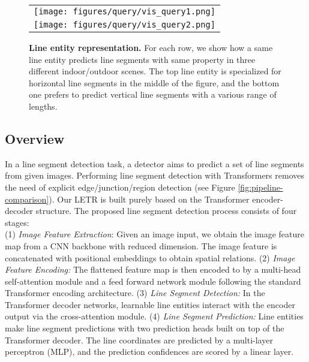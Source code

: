 \documentclass[final]{cvpr}
\begin{document}
\begin{figure}
\begin{center}
\begin{tabular}{c}
\texttt{[image: figures/query/vis\_query1.png]} \\
\texttt{[image: figures/query/vis\_query2.png]}

\end{tabular}
\caption{\small \textbf{Line entity representation.} For each row, we show how a same line entity predicts line segments with same property in three different indoor/outdoor scenes. The top line entity is specialized for horizontal line segments in the middle of the figure, and the bottom one prefers to predict vertical line segments with a various range of lengths.}
\label{fig:vis_q1}
\vspace{-10mm}
\end{center}
\end{figure}
\vspace{-2mm}
\subsection{Overview}
\vspace{-2mm}
In a line segment detection task, a detector aims to predict a set of line segments from given images. Performing line segment detection with Transformers removes the need of explicit edge/junction/region detection \cite{zhou2019end, xue2020holistically} (see Figure \ref{fig:pipeline-comparison}). Our LETR is built purely based on the Transformer encoder-decoder structure. The proposed line segment detection process consists of four stages: \\
(1) {\em Image Feature Extraction}: Given an image input, we obtain the image feature map  from a CNN backbone with reduced dimension. The image feature is concatenated with positional embeddings to obtain spatial relations. (2) {\em Image Feature Encoding:} The flattened feature map  is then encoded to  by a multi-head self-attention module and a feed forward network module following the standard Transformer encoding architecture. (3) {\em Line Segment Detection:} In the Transformer decoder networks,  learnable line entities  interact with the encoder output via the cross-attention module. (4) {\em Line Segment Prediction:} Line entities make line segment predictions with two prediction heads built on top of the Transformer decoder. The line coordinates are predicted by a multi-layer perceptron (MLP), and the prediction confidences are scored by a linear layer. 
\end{document}
